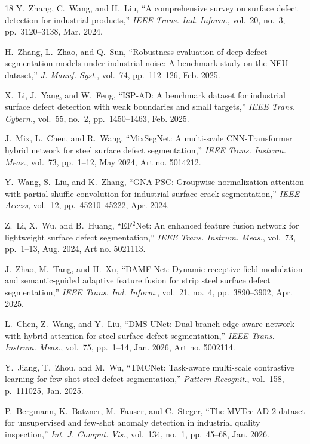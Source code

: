 \documentclass{ieeeaccess}
\begin{document}
\begin{thebibliography}{18}
Y.~Zhang, C.~Wang, and H.~Liu, ``A comprehensive survey on surface defect detection for industrial products,'' \emph{IEEE Trans. Ind. Inform.}, vol.~20, no.~3, pp.~3120--3138, Mar. 2024.

H.~Zhang, L.~Zhao, and Q.~Sun, ``Robustness evaluation of deep defect segmentation models under industrial noise: A benchmark study on the NEU dataset,'' \emph{J. Manuf. Syst.}, vol.~74, pp.~112--126, Feb. 2025.

X.~Li, J.~Yang, and W.~Feng, ``ISP-AD: A benchmark dataset for industrial surface defect detection with weak boundaries and small targets,'' \emph{IEEE Trans. Cybern.}, vol.~55, no.~2, pp.~1450--1463, Feb. 2025.

J.~Mix, L.~Chen, and R.~Wang, ``MixSegNet: A multi-scale CNN-Transformer hybrid network for steel surface defect segmentation,'' \emph{IEEE Trans. Instrum. Meas.}, vol.~73, pp.~1--12, May 2024, Art no. 5014212.

Y.~Wang, S.~Liu, and K.~Zhang, ``GNA-PSC: Groupwise normalization attention with partial shuffle convolution for industrial surface crack segmentation,'' \emph{IEEE Access}, vol.~12, pp.~45210--45222, Apr. 2024.

Z.~Li, X.~Wu, and B.~Huang, ``EF$^2$Net: An enhanced feature fusion network for lightweight surface defect segmentation,'' \emph{IEEE Trans. Instrum. Meas.}, vol.~73, pp.~1--13, Aug. 2024, Art no. 5021113.

J.~Zhao, M.~Tang, and H.~Xu, ``DAMF-Net: Dynamic receptive field modulation and semantic-guided adaptive feature fusion for strip steel surface defect segmentation,'' \emph{IEEE Trans. Ind. Inform.}, vol.~21, no.~4, pp.~3890--3902, Apr. 2025.

L.~Chen, Z.~Wang, and Y.~Liu, ``DMS-UNet: Dual-branch edge-aware network with hybrid attention for steel surface defect segmentation,'' \emph{IEEE Trans. Instrum. Meas.}, vol.~75, pp.~1--14, Jan. 2026, Art no. 5002114.

Y.~Jiang, T.~Zhou, and M.~Wu, ``TMCNet: Task-aware multi-scale contrastive learning for few-shot steel defect segmentation,'' \emph{Pattern Recognit.}, vol.~158, p.~111025, Jan. 2025.

P.~Bergmann, K.~Batzner, M.~Fauser, and C.~Steger, ``The MVTec AD 2 dataset for unsupervised and few-shot anomaly detection in industrial quality inspection,'' \emph{Int. J. Comput. Vis.}, vol.~134, no.~1, pp.~45--68, Jan. 2026.


\end{thebibliography}
\end{document}
